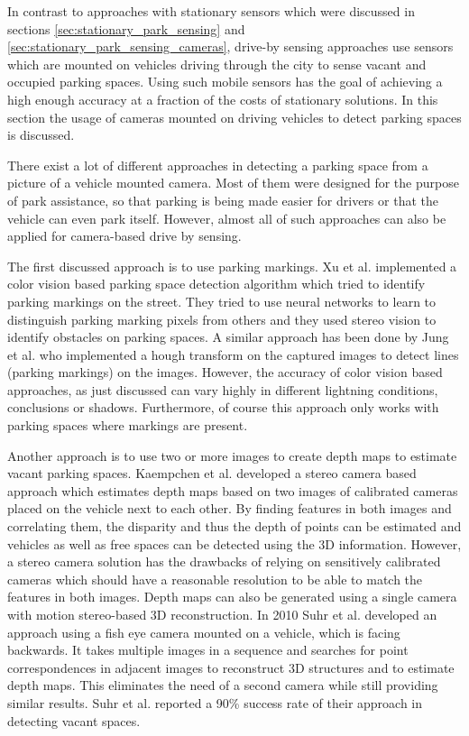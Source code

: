 In contrast to approaches with stationary sensors which were discussed in sections \ref{sec:stationary_park_sensing} and \ref{sec:stationary_park_sensing_cameras}, drive-by sensing approaches use sensors which are mounted on vehicles driving through the city to sense vacant and occupied parking spaces. Using such mobile sensors has the goal of achieving a high enough accuracy at a fraction of the costs of stationary solutions. In this section the usage of cameras mounted on driving vehicles to detect parking spaces is discussed.

There exist a lot of different approaches in detecting a parking space from a picture of a vehicle mounted camera. Most of them were designed for the purpose of park assistance, so that parking is being made easier for drivers or that the vehicle can even park itself. However, almost all of such approaches can also be applied for camera-based drive by sensing. 

The first discussed approach is to use parking markings. Xu et al. \cite{Xu2000} implemented a color vision based parking space detection algorithm which tried to identify parking markings on the street. They tried to use neural networks to learn to distinguish parking marking pixels from others and they used stereo vision to identify obstacles on parking spaces. A similar approach has been done by Jung et al. \cite{Jung2006} who implemented a hough transform on the captured images to detect lines (parking markings) on the images. However, the accuracy of color vision based approaches, as just discussed can vary highly in different lightning conditions, conclusions or shadows. Furthermore, of course this approach only works with parking spaces where markings are present.

Another approach is to use two or more images to create depth maps to estimate vacant parking spaces. Kaempchen et al. \cite{Kaempchen2002} developed a stereo camera based approach which estimates depth maps based on two images of calibrated cameras placed on the vehicle next to each other. By finding features in both images and correlating them, the disparity and thus the depth of points can be estimated and vehicles as well as free spaces can be detected using the 3D information. However, a stereo camera solution has the drawbacks of relying on sensitively calibrated cameras which should have a reasonable resolution to be able to match the features in both images. 
Depth maps can also be generated using a single camera with motion stereo-based 3D reconstruction. In 2010 Suhr et al. \cite{Suhr2010} developed an approach using a fish eye camera mounted on a vehicle, which is facing backwards. It takes multiple images in a sequence and searches for point correspondences in adjacent images to reconstruct 3D structures and to estimate depth maps. This eliminates the need of a second camera while still providing similar results. Suhr et al. reported a 90\% success rate of their approach in detecting vacant spaces.

